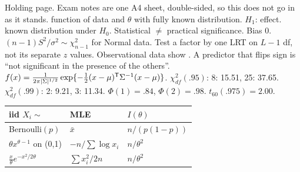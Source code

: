 \lineskip=0.6pt \lineskiplimit=0pt \normallineskip=0.6pt \normallineskiplimit=0pt
Holding page. Exam notes are one A4 sheet, double-sided, so this does not go in as it stands.
  function of data and $\theta$ with fully known distribution.
\bx
{} $H_1$: effect.  known distribution under $H_0$. Statistical $\ne$ practical significance.  Bias 0. $(n-1)S^2/\sigma^2\sim\chi^2_{n-1}$ for Normal data.
\sk{} Test a factor by one LRT on $L-1$ df, not its separate $z$ values. Observational data show . A predictor that flips sign is “not significant in the presence of the others”.
\sk{} $f(x)=\frac{1}{2\pi|\Sigma|^{1/2}}\exp\{-\frac12(x-\mu)^{\mathsf T}\Sigma^{-1}(x-\mu)\}$.
\sk{} $\chi^2_{df}(.95)$: 8: 15.51, 25: 37.65. $\chi^2_{df}(.99)$: 2: 9.21, 3: 11.34. $\Phi(1)=.84$, $\Phi(2)=.98$. $t_{60}(.975)=2.00$.
\par
{\renewcommand{\arraystretch}{1.1}%
\begin{tabular}{@{}|p{50pt}|p{42pt}|p{37pt}|@{}}\hline
\rowcolor{hdr}iid $X_i\sim$&MLE&$I(\theta)$\\\hline
Bernoulli$(p)$&$\bar x$&$n/(p(1{-}p))$\\\hline
$\theta x^{\theta-1}$ on (0,1)&$-n/\sum\log x_i$&$n/\theta^2$\\\hline
$\frac x\theta e^{-x^2/2\theta}$&$\sum x_i^2/2n$&$n/\theta^2$\\\hline
\end{tabular}}
